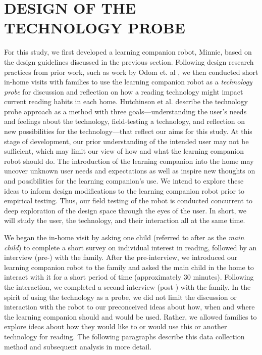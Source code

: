 \documentclass{sigchi}
\begin{document}

\section{DESIGN OF THE TECHNOLOGY PROBE}
 For this study, we first developed a learning companion robot, Minnie, based on the design guidelines discussed in the previous section. Following design research practices from prior work, such as work by Odom et. al \cite{Odom:2012}, we then conducted short in-home visits with families to use the learning companion robot as a \textit{technology probe} \cite{Hutchinson:2003} for discussion and reflection on how a reading technology might impact current reading habits in each home. Hutchinson et al. \cite{Hutchinson:2003} describe the technology probe approach as a method with three goals---understanding the user's needs and feelings about the technology, field-testing a technology, and reflection on new possibilities for the technology---that reflect our aims for this study. At this stage of development, our prior understanding of the intended user may not be sufficient, which may limit our view of how and what the learning companion robot should do. The introduction of the learning companion into the home may uncover unknown user needs and expectations as well as inspire new thoughts on and possibilities for the learning companion's use. We intend to explore these ideas to inform design modifications to the learning companion robot prior to empirical testing. Thus, our field testing of the robot is conducted concurrent to deep exploration of the design space through the eyes of the user. In short, we will study the user, the technology, and their interaction all at the same time.

 
We began the in-home visit by asking one child (referred to after as the \textit{main child}) to complete a short survey on individual interest in reading, followed by an interview (pre-) with the family. After the pre-interview, we introduced our learning companion robot to the family and asked the main child in the home to interact with it for a short period of time (approximately 30 minutes). Following the interaction, we completed a second interview (post-) with the family. In the spirit of using the technology as a probe, we did not limit the discussion or interaction with the robot to our preconceived ideas about how, when and where the learning companion should and would be used. Rather, we allowed families to explore ideas about how they would like to or would use this or another technology for reading. The following paragraphs describe this data collection method and subsequent analysis in more detail.
 
\end{document}
